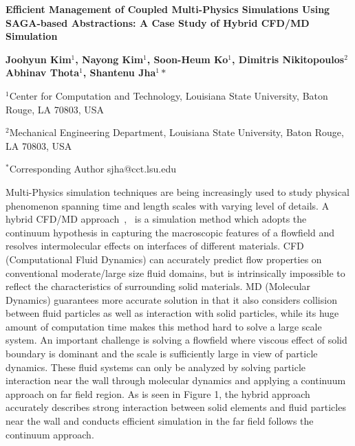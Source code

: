 \documentclass[a4paper]{article}
\newcommand{\Nkimnote}[1]{ {\textcolor{green} { ***Nkim: #1 }}}
\newcommand{\Nkimnote}[1]{}
\begin{document}
\begin{center}


\textbf {\large \bf Efficient Management of Coupled Multi-Physics Simulations
Using SAGA-based Abstractions: A Case Study of  Hybrid CFD/MD Simulation}
\vspace{14pt}

\textbf {\normalsize \hspace{0.6 in} Joohyun Kim$^1$, Nayong Kim$^1$, Soon-Heum Ko$^1$, Dimitris Nikitopoulos$^2$  \newline Abhinav Thota$^1$, Shantenu Jha$^1*$ }

\vspace{12pt}

\normalsize { \hspace{0.6 in} $^1$Center for Computation and Technology, \newline Louisiana State University, Baton Rouge, LA 70803, USA}

\normalsize {\hspace{0.6 in} $^2$Mechanical Engineering Department, \newline Louisiana State University, Baton Rouge, LA 70803, USA}

\vspace{0.2in}
\footnotesize {\hspace{0.0 in} $^*$Corresponding Author sjha@cct.lsu.edu}


\vspace{12pt}

\end{center}

Multi-Physics simulation techniques are being increasingly used to study physical phenomenon spanning time and length scales with varying level of details.  A hybrid CFD/MD approach~\cite{Nie:2004},~\cite{Yen:2007} is a simulation method which adopts the continuum hypothesis in capturing the macroscopic features of a flowfield and resolves intermolecular effects on interfaces of different materials. CFD (Computational Fluid Dynamics) can accurately predict flow properties on conventional moderate/large size fluid domains, but is intrinsically impossible to reflect the characteristics of surrounding solid materials. MD (Molecular Dynamics) guarantees more accurate solution in that it also considers collision between fluid particles as well as interaction with solid particles, while its huge amount of computation time makes this method hard to solve a large scale system. An important challenge is solving a flowfield where viscous effect of solid boundary is dominant and the scale is sufficiently large in view of particle dynamics. These fluid systems can only be analyzed by solving particle interaction near the wall through molecular dynamics and applying a continuum approach on far field region. As is seen in Figure 1, the hybrid approach accurately describes strong interaction between solid elements and fluid particles near the wall and conducts efficient simulation in the far field follows the continuum approach.
\end{document}
